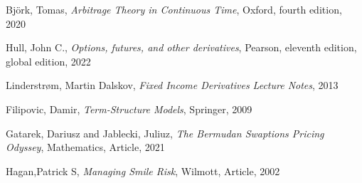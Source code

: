 \clearpage
{}

\begin{thebibliography}{25}
Björk, Tomas,
\emph{Arbitrage Theory in Continuous Time},
 Oxford, fourth edition, 2020

Hull, John C., 
\emph{Options, futures, and other derivatives},
Pearson, eleventh edition, global edition, 2022

Linderstrøm, Martin Dalskov, 
\emph{Fixed Income Derivatives Lecture Notes},
2013

Filipovic, Damir, \emph{Term-Structure Models}, 
Springer, 2009

Gatarek, Dariusz and Jablecki, Juliuz, \emph{The Bermudan Swaptions Pricing Odyssey},
Mathematics, Article, 2021

Hagan,Patrick S, \emph{Managing Smile Risk},
Wilmott, Article, 2002

\end{thebibliography}


